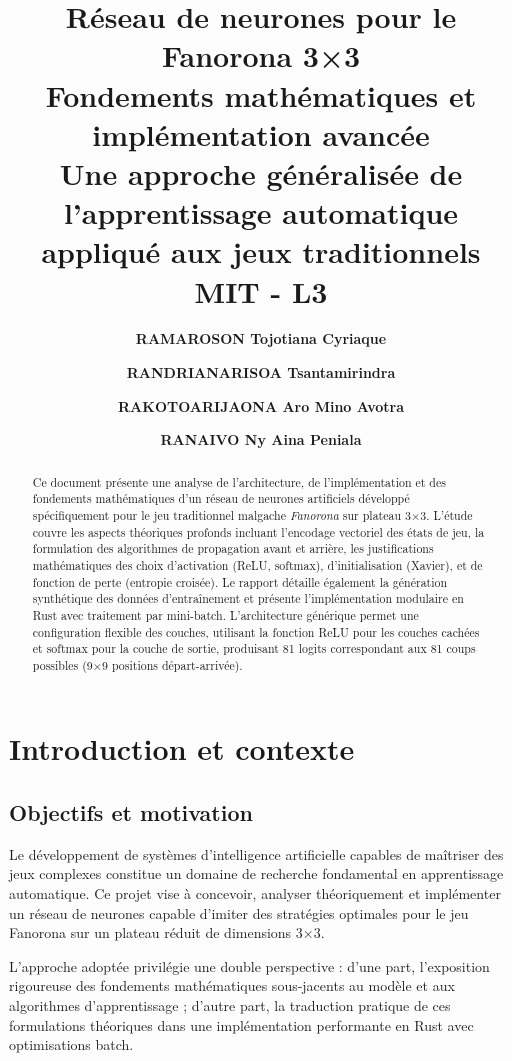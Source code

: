 \documentclass[12pt,a4paper]{report}
\title{
  \vspace{-2cm}
  {\color{primaryblue}\Huge\textbf{Réseau de neurones pour le Fanorona 3×3}}\\
  \vspace{0.5cm}
  {\color{secondarygreen}\Large Fondements mathématiques et implémentation avancée}\\
  \vspace{0.3cm}
  {\color{accentorange}\large Une approche généralisée de l'apprentissage automatique appliqué aux jeux traditionnels}\\
  \vspace{1.0cm}
  {\color{primaryblue}\large MIT - L3}
}
\author{
  \vspace{0.3cm}
  {\color{primaryblue}\textbf{RAMAROSON Tojotiana Cyriaque}} \and 
  \vspace{0.3cm}
  {\color{primaryblue}\textbf{RANDRIANARISOA Tsantamirindra}} \and 
  \vspace{0.3cm} 
  {\color{primaryblue}\textbf{RAKOTOARIJAONA Aro Mino Avotra}} \and
  \vspace{0.3cm} 
  {\color{primaryblue}\textbf{RANAIVO Ny Aina Peniala}}
}
\date{}
\numberwithin{equation}{section}
\begin{document}
\maketitle

\begin{abstract}
\color{black}
Ce document présente une analyse de l'architecture, de l'implémentation et des fondements mathématiques d'un réseau de neurones artificiels développé spécifiquement pour le jeu traditionnel malgache \emph{Fanorona} sur plateau 3×3. L'étude couvre les aspects théoriques profonds incluant l'encodage vectoriel des états de jeu, la formulation des algorithmes de propagation avant et arrière, les justifications mathématiques des choix d'activation (ReLU, softmax), d'initialisation (Xavier), et de fonction de perte (entropie croisée). Le rapport détaille également la génération synthétique des données d'entraînement et présente l'implémentation modulaire en Rust avec traitement par mini-batch. L'architecture générique permet une configuration flexible des couches, utilisant la fonction ReLU pour les couches cachées et softmax pour la couche de sortie, produisant 81 logits correspondant aux 81 coups possibles (9×9 positions départ-arrivée).
\end{abstract}

\clearpage
\tableofcontents
\clearpage
{}

\chapter{Introduction et contexte}

\section{Objectifs et motivation}
Le développement de systèmes d'intelligence artificielle capables de maîtriser des jeux complexes constitue un domaine de recherche fondamental en apprentissage automatique. Ce projet vise à concevoir, analyser théoriquement et implémenter un réseau de neurones capable d'imiter des stratégies optimales pour le jeu Fanorona sur un plateau réduit de dimensions 3×3.

\begin{important}
L'approche adoptée privilégie une double perspective : d'une part, l'exposition rigoureuse des fondements mathématiques sous-jacents au modèle et aux algorithmes d'apprentissage ; d'autre part, la traduction pratique de ces formulations théoriques dans une implémentation performante en Rust avec optimisations batch.
\end{important}
\end{document}
